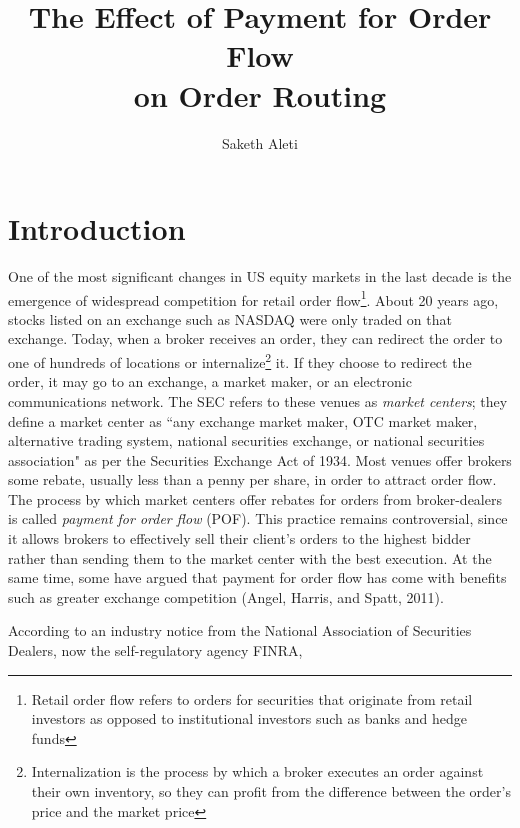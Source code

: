 \documentclass[12pt,a4paper]{article}
\begin{document}
	
\title{\textbf{The Effect of Payment for Order Flow} \\ \vspace{-0.5em} \textbf{on Order Routing}}

\author[]{Saketh Aleti}


\maketitle


\section{Introduction}	

One of the most significant changes in US equity markets in the last decade is the emergence of widespread competition for retail order flow\footnote{ Retail order flow refers to orders for securities that originate from retail investors as opposed to institutional investors such as banks and hedge funds}. About 20 years ago, stocks listed on an exchange such as NASDAQ were only traded on that exchange. Today, when a broker receives an order, they can redirect the order to one of hundreds of locations or internalize\footnote{ Internalization is the process by which a broker executes an order against their own inventory, so they can profit from the difference between the order's price and the market price} it. If they choose to redirect the order, it may go to an exchange, a market maker, or an electronic communications network. 
The SEC refers to these venues as \textit{market centers}; they define a market center as ``any exchange market maker, OTC market maker, alternative trading system, national securities exchange, or national securities association" as per the Securities Exchange Act of 1934.
Most venues offer brokers some rebate, usually less than a penny per share, in order to attract order flow.  The process by which market centers offer rebates for orders from broker-dealers is called \textit{payment for order flow} (POF). This practice remains controversial, since it allows brokers to effectively sell their client's orders to the highest bidder rather than sending them to the market center with the best execution. At the same time, some have argued that payment for order flow has come with benefits such as greater exchange competition (Angel, Harris, and Spatt, 2011). 


According to an industry notice from the National Association of Securities Dealers, now the self-regulatory agency FINRA,
\end{document}
